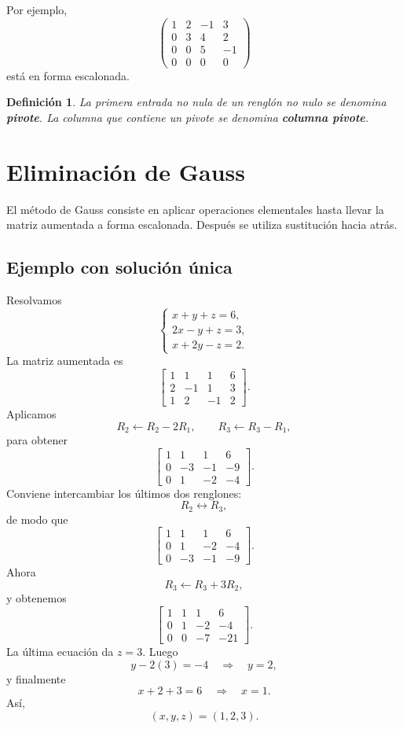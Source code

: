 \documentclass[12pt]{article}
\newtheorem{definicion}{Definición}[section]
\theoremstyle{remark}
\begin{document}
Por ejemplo,
\[
\begin{pmatrix}
1&2&-1&3\\
0&3&4&2\\
0&0&5&-1\\
0&0&0&0
\end{pmatrix}
\]
está en forma escalonada.

\begin{definicion}
La primera entrada no nula de un renglón no nulo se denomina \textbf{pivote}. La columna que contiene
un pivote se denomina \textbf{columna pivote}.
\end{definicion}

\section{Eliminación de Gauss}

El método de Gauss consiste en aplicar operaciones elementales hasta llevar la matriz aumentada a forma
escalonada. Después se utiliza sustitución hacia atrás.

\subsection{Ejemplo con solución única}

Resolvamos
\[
\begin{cases}
x+y+z=6,\\
2x-y+z=3,\\
x+2y-z=2.
\end{cases}
\]
La matriz aumentada es
\[
\left[
\begin{array}{ccc|c}
1&1&1&6\\
2&-1&1&3\\
1&2&-1&2
\end{array}
\right].
\]
Aplicamos
\[
R_2\leftarrow R_2-2R_1,\qquad
R_3\leftarrow R_3-R_1,
\]
para obtener
\[
\left[
\begin{array}{ccc|c}
1&1&1&6\\
0&-3&-1&-9\\
0&1&-2&-4
\end{array}
\right].
\]
Conviene intercambiar los últimos dos renglones:
\[
R_2\leftrightarrow R_3,
\]
de modo que
\[
\left[
\begin{array}{ccc|c}
1&1&1&6\\
0&1&-2&-4\\
0&-3&-1&-9
\end{array}
\right].
\]
Ahora
\[
R_3\leftarrow R_3+3R_2,
\]
y obtenemos
\[
\left[
\begin{array}{ccc|c}
1&1&1&6\\
0&1&-2&-4\\
0&0&-7&-21
\end{array}
\right].
\]
La última ecuación da $z=3$. Luego
\[
y-2(3)=-4\quad\Longrightarrow\quad y=2,
\]
y finalmente
\[
x+2+3=6\quad\Longrightarrow\quad x=1.
\]
Así,
\[
\boxed{(x,y,z)=(1,2,3)}.
\]
\end{document}
